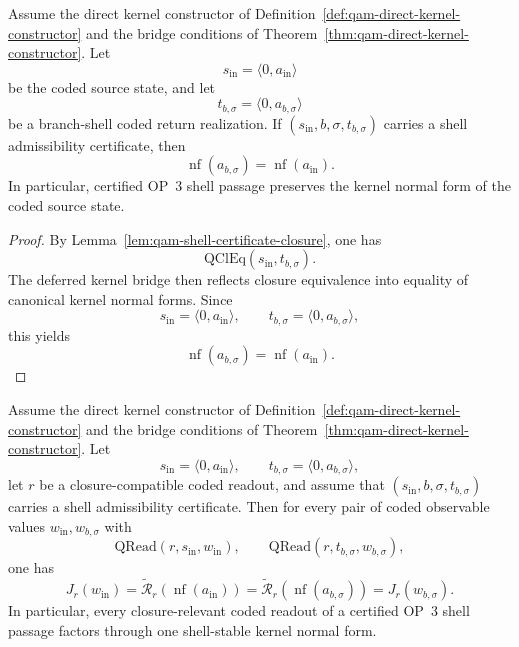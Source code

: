 \begin{proposition}\label{prop:qam-shell-certificate-kernel}
Assume the direct kernel constructor of Definition~\ref{def:qam-direct-kernel-constructor} and the bridge conditions of Theorem~\ref{thm:qam-direct-kernel-constructor}. Let
\[
s_{\mathrm{in}}=\langle 0,a_{\mathrm{in}}\rangle
\]
be the coded source state, and let
\[
t_{b,\sigma}=\langle 0,a_{b,\sigma}\rangle
\]
be a branch-shell coded return realization. If $(s_{\mathrm{in}},b,\sigma,t_{b,\sigma})$ carries a shell admissibility certificate, then
\[
\operatorname{nf}(a_{b,\sigma})=\operatorname{nf}(a_{\mathrm{in}}).
\]
In particular, certified OP~3 shell passage preserves the kernel normal form of the coded source state.
\end{proposition}

\begin{proof}
By Lemma~\ref{lem:qam-shell-certificate-closure}, one has
\[
\mathrm{QClEq}(s_{\mathrm{in}},t_{b,\sigma}).
\]
The deferred kernel bridge then reflects closure equivalence into equality of canonical kernel normal forms. Since
\[
s_{\mathrm{in}}=\langle 0,a_{\mathrm{in}}\rangle,
\qquad
 t_{b,\sigma}=\langle 0,a_{b,\sigma}\rangle,
\]
this yields
\[
\operatorname{nf}(a_{b,\sigma})=\operatorname{nf}(a_{\mathrm{in}}).
\]
\end{proof}

\begin{theorem}\label{thm:qam-shell-stable-readout}
Assume the direct kernel constructor of Definition~\ref{def:qam-direct-kernel-constructor} and the bridge conditions of Theorem~\ref{thm:qam-direct-kernel-constructor}. Let
\[
s_{\mathrm{in}}=\langle 0,a_{\mathrm{in}}\rangle,
\qquad
 t_{b,\sigma}=\langle 0,a_{b,\sigma}\rangle,
\]
let $r$ be a closure-compatible coded readout, and assume that $(s_{\mathrm{in}},b,\sigma,t_{b,\sigma})$ carries a shell admissibility certificate. Then for every pair of coded observable values $w_{\mathrm{in}},w_{b,\sigma}$ with
\[
\mathrm{QRead}(r,s_{\mathrm{in}},w_{\mathrm{in}}),
\qquad
\mathrm{QRead}(r,t_{b,\sigma},w_{b,\sigma}),
\]
one has
\[
J_r(w_{\mathrm{in}})
=
\widetilde{\mathcal R}_r(\operatorname{nf}(a_{\mathrm{in}}))
=
\widetilde{\mathcal R}_r(\operatorname{nf}(a_{b,\sigma}))
=
J_r(w_{b,\sigma}).
\]
In particular, every closure-relevant coded readout of a certified OP~3 shell passage factors through one shell-stable kernel normal form.
\end{theorem}

